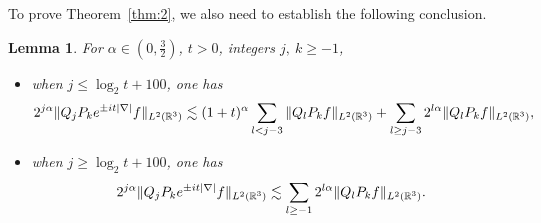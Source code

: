 \documentclass[11pt,twoside]{article}
\def\R{\mathop{\mathbb R\kern 0pt}\nolimits}
\def\f{\frac}
\def\ls{\lesssim}
\theoremstyle{plain}
\newtheorem{lemma}[theorem]{Lemma}
\theoremstyle{definition}
\numberwithin{equation}{section}
\begin{document}
	To prove Theorem~\ref{thm:2}, we also need to establish the following  conclusion.
	\begin{lemma}\label{lem:Technical lemma}
		For $\alpha\in(0,\f32)$, $t > 0 $, integers $j,\ k\ge -1$,
		\begin{itemize}
			\item[(1)] when $j\le \log_2t+100$, one has
			\begin{equation}
				2^{j\alpha}\|Q_jP_k e^{\pm it|\nabla|}f\|_{L^2(\R^3)}
				\ls
				(1+t)^\alpha\sum_{l< j-3}\|Q_lP_k f\|_{L^2(\R^3)}
				+
				\sum_{l\ge j-3}2^{l\alpha}\|Q_lP_k f\|_{L^2(\R^3)},
			\end{equation}
			\item[(2)] when $j\ge \log_2t+100$, one has
			\begin{equation}
				2^{j\alpha}\|Q_jP_k e^{\pm it|\nabla|}f\|_{L^2(\R^3)}
				\ls
				\sum_{l\ge-1}2^{l\alpha}\|Q_lP_k f\|_{L^2(\R^3)}.
			\end{equation}
		\end{itemize}
	\end{lemma}
\end{document}
